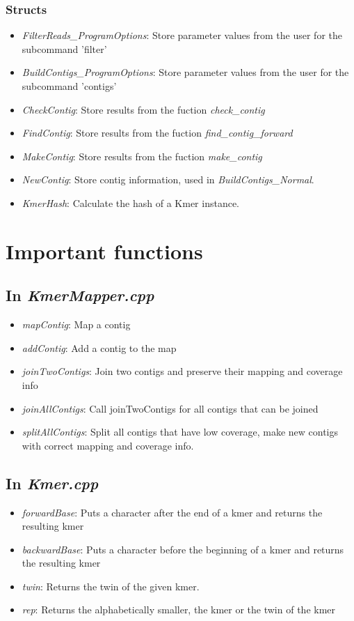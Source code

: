 \documentclass[a4paper]{report}
\renewcommand{\i}[1]{\textit{#1}}  %
\begin{document}
\subsection{Structs}
\begin{itemize}
\item \i{FilterReads\_ProgramOptions}: Store parameter values from the user for the subcommand 'filter'
\item \i{BuildContigs\_ProgramOptions}: Store parameter values from the user for the subcommand 'contigs'
\item \i{CheckContig}: Store results from the fuction \i{check\_contig}
\item \i{FindContig}: Store results from the fuction \i{find\_contig\_forward}  
\item \i{MakeContig}: Store results from the fuction \i{make\_contig}
\item \i{NewContig}: Store contig information, used in \i{BuildContigs\_Normal}.
\item \i{KmerHash}: Calculate the hash of a Kmer instance.
\end{itemize}

\chapter{Important functions}

\section{In \i{KmerMapper.cpp}}
\begin{itemize}
\item \i{mapContig}: Map a contig
\item \i{addContig}: Add a contig to the map
\item \i{joinTwoContigs}: Join two contigs and preserve their mapping and coverage info
\item \i{joinAllContigs}: Call joinTwoContigs for all contigs that can be joined
\item \i{splitAllContigs}: Split all contigs that have low coverage, make new contigs with correct mapping and coverage info.
\end{itemize}

\section{In \i{Kmer.cpp}}

\begin{itemize}
\item \i{forwardBase}: Puts a character after the end of a kmer and returns the resulting kmer
\item \i{backwardBase}: Puts a character before the beginning of a kmer and returns the resulting kmer
\item \i{twin}: Returns the twin of the given kmer.
\item \i{rep}: Returns the alphabetically smaller, the kmer or the twin of the kmer
\end{itemize}
\end{document}
